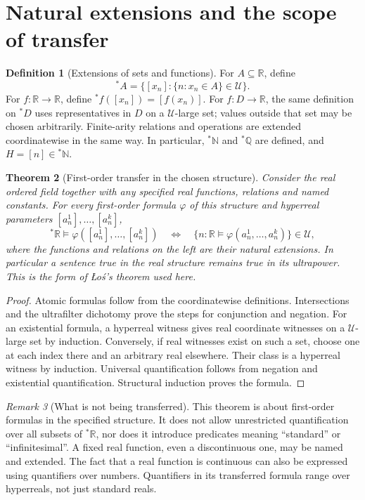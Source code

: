 \documentclass[11pt]{article}
\newtheorem{theorem}{Theorem}[section]
\theoremstyle{definition}
\newtheorem{definition}[theorem]{Definition}
\theoremstyle{remark}
\newtheorem{remark}[theorem]{Remark}
\newcommand{\RR}{\mathbb R}
\newcommand{\NN}{\mathbb N}
\newcommand{\QQ}{\mathbb Q}
\newcommand{\HR}{{}^{*}\mathbb R}
\newcommand{\ext}[1]{{}^{*}\!#1}
\newcommand{\U}{\mathcal U}
\begin{document}
\section{Natural extensions and the scope of transfer}
\begin{definition}[Extensions of sets and functions]\label{def:extension}
For \(A\subseteq\RR\), define
\[
\ext A=\{[x_n]:\{n:x_n\in A\}\in\U\}.
\]
For \(f:\RR\to\RR\), define \(\ext f([x_n])=[f(x_n)]\).
For \(f:D\to\RR\), the same definition on \(\ext D\) uses representatives
in \(D\) on a \(\U\)-large set; values outside that set may be chosen arbitrarily.
Finite-arity relations and operations are extended coordinatewise in the same way.
In particular, \(\ext\NN\) and \(\ext\QQ\) are defined, and \(H=[n]\in\ext\NN\).
\end{definition}
\begin{theorem}[First-order transfer in the chosen structure]\label{thm:transfer}
Consider the real ordered field together with any specified real functions,
relations and named constants. For every first-order formula \(\varphi\) of
this structure and hyperreal parameters \([a_n^1],\ldots,[a_n^k]\),
\[
\HR\models\varphi([a_n^1],\ldots,[a_n^k])
\quad\Longleftrightarrow\quad
\{n:\RR\models\varphi(a_n^1,\ldots,a_n^k)\}\in\U,
\]
where the functions and relations on the left are their natural extensions.
In particular a sentence true in the real structure remains true in its
ultrapower. This is the form of \L o\'s's theorem used here.
\end{theorem}
\begin{proof}
Atomic formulas follow from the coordinatewise definitions. Intersections and
the ultrafilter dichotomy prove the steps for conjunction and negation.
For an existential formula, a hyperreal witness gives real coordinate witnesses
on a \(\U\)-large set by induction. Conversely, if real witnesses exist on
such a set, choose one at each index there and an arbitrary real elsewhere.
Their class is a hyperreal witness by induction. Universal quantification follows
from negation and existential quantification. Structural induction proves the formula.
\end{proof}
\begin{remark}[What is not being transferred]\label{rem:scope}
This theorem is about first-order formulas in the specified structure.
It does not allow unrestricted quantification over all subsets of \(\HR\),
nor does it introduce predicates meaning ``standard'' or ``infinitesimal''.
A fixed real function, even a discontinuous one, may be named and extended.
The fact that a real function is continuous can also be expressed using
quantifiers over numbers. Quantifiers in its transferred formula range over
hyperreals, not just standard reals.
\end{remark}
\end{document}
